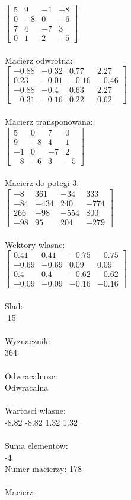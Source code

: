 \documentclass[a4paper,12pt]{article}
\begin{document}
$\begin{bmatrix} 5&9&-1&-8\\0&-8&0&-6\\7&4&-7&3\\0&1&2&-5 \end{bmatrix}$
\\
\\
Macierz odwrotna:\\

$\begin{bmatrix} -0.88&-0.32&0.77&2.27\\0.23&-0.01&-0.16&-0.46\\-0.88&-0.4&0.63&2.27\\-0.31&-0.16&0.22&0.62 \end{bmatrix}$
\\
\\
Macierz transponowana:\\

$\begin{bmatrix} 5&0&7&0\\9&-8&4&1\\-1&0&-7&2\\-8&-6&3&-5 \end{bmatrix}$
\\
\\
Macierz do potegi 3:\\

$\begin{bmatrix} -8&361&-34&333\\-84&-434&240&-774\\266&-98&-554&800\\-98&95&204&-279 \end{bmatrix}$
\\
\\
Wektory wlasne:\\

$\begin{bmatrix} 0.41&0.41&-0.75&-0.75\\-0.69&-0.69&0.09&0.09\\0.4&0.4&-0.62&-0.62\\-0.09&-0.09&-0.16&-0.16 \end{bmatrix}$
\\
\\
Slad:\\
-15
\\
\\
Wyznacznik:\\
364
\\
\\
Odwracalnosc:\\
Odwracalna
\\
\\
Wartosci wlasne:\\
-8.82 -8.82 1.32 1.32
\\
\\
Suma elementow:\\
-4
\\
\newpage
Numer macierzy:
178
\\
\\
Macierz:\\
\end{document}
